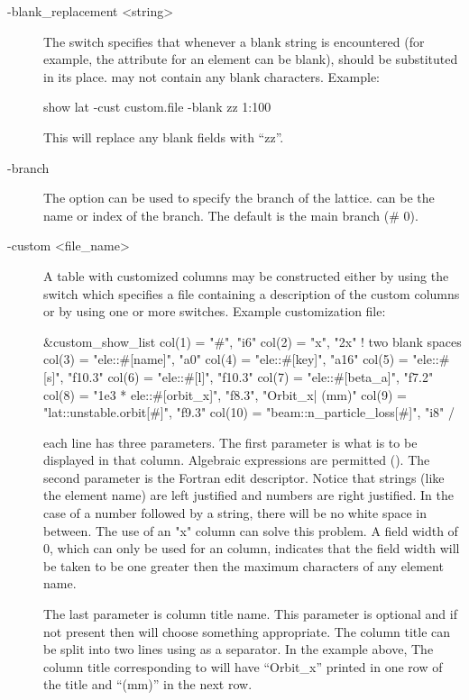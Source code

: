 {{{{{{{{\begin{description}
%
\item[-blank_replacement <string>] \Newline
The  switch specifies that whenever a blank string is encountered (for
example, the  attribute for an element can be blank),  should be substituted
in its place.  may not contain any blank characters. Example:
\begin{example}
  show lat -cust custom.file -blank zz 1:100
\end{example}
This will replace any blank fields with ``zz''.
%
\item[-branch] \Newline
The  option can be used to specify the branch of the lattice.
 can be the name or index of the branch.  The default is the main branch (\# 0).
%
\item[-custom <file_name>] \Newline
A table with customized columns may be constructed either by using the  switch which
specifies a file containing a description of the custom columns or by using one or more
 switches. Example customization file:
\begin{example}
  &custom_show_list
    col(1)  = "#",                      "i6"  
    col(2)  = "x",                      "2x"    ! two blank spaces
    col(3)  = "ele::#[name]",           "a0"  
    col(4)  = "ele::#[key]",            "a16"
    col(5)  = "ele::#[s]",              "f10.3"
    col(6)  = "ele::#[l]",              "f10.3"
    col(7)  = "ele::#[beta_a]",         "f7.2"
    col(8)  = "1e3 * ele::#[orbit_x]",  "f8.3", "Orbit_x| (mm)" 
    col(9)  = "lat::unstable.orbit[#]", "f9.3"
    col(10) = "beam::n_particle_loss[#]", "i8"
  /
\end{example}
each  line has three parameters. The first parameter is what is to be displayed in that
column. Algebraic expressions are permitted (). The second parameter is the
Fortran edit descriptor. Notice that strings (like the element name) are left justified and numbers
are right justified. In the case of a number followed by a string, there will be no white space in
between. The use of an "x" column can solve this problem. A field width of 0, which can only be used
for an  column, indicates that the field width will be taken to be one greater
then the maximum characters of any element name.

The last parameter is column title name. This parameter is optional and if not present then \tao
will choose something appropriate. The column title can be split into two lines using  as a
separator.  In the example above, The column title corresponding to  will have
``Orbit_x'' printed in one row of the title and ``(mm)'' in the next row.


\end{description}}}}}}}}}
